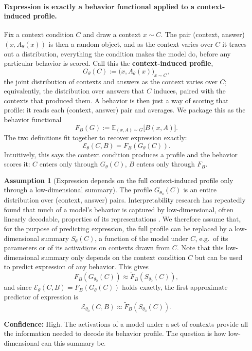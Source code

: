 \documentclass[11pt]{article}
\theoremstyle{definition}
\theoremstyle{definition}
\theoremstyle{assumptionstyle}
\newtheorem{assumption}{Assumption}[section]
\newcommand{\E}{\mathbb{E}}            %
\newcommand{\Expr}{\mathcal{E}}        %
\begin{document}
\paragraph{Expression is exactly a behavior functional applied to a context-induced profile.}
Fix a context condition \(C\) and draw a context \(x\sim C\). The pair
(context, answer) \((x,A_\theta(x))\) is then a random object, and
as the context varies over \(C\) it traces out a distribution, everything the
condition makes the model do, before any particular behavior is scored. Call this the
\textbf{context-induced profile},
\[
G_\theta(C)
:=
\big(x,A_\theta(x)\big)_{x\sim C},
\]
the joint distribution of contexts and answers as the context varies over \(C\);
equivalently, the distribution over answers that \(C\) induces, paired with the
contexts that produced them. A behavior is
then just a way of scoring that profile: it reads each (context, answer) pair and
averages. We package this as the behavior functional
\[
F_B(G)
:=
\E_{(x,A)\sim G}
\big[
B(x,A)
\big].
\]
The two definitions fit together to recover expression exactly:
\[
\Expr_\theta(C,B)
=
F_B(G_\theta(C)).
\]
Intuitively, this says the context condition produces a profile and the behavior
scores it: \(C\) enters only through \(G_\theta(C)\), \(B\) enters only through
\(F_B\).
\begin{assumption}[Expression depends on the full context-induced profile only through a low-dimensional summary]
\label{a:profile-summary}
The profile \(G_{\theta_0}(C)\) is an entire distribution over (context, answer)
pairs. Interpretability research has repeatedly found that much of a model's
behavior is captured by low-dimensional, often linearly decodable, properties of
its representations \cite{park2023,gurnee2023,belrose2023,zou2023}. We therefore
assume that, for the purpose of predicting expression, the full profile can be
replaced by a low-dimensional summary \(S_\theta(C)\), a function of the model
under \(C\), e.g.\ of its parameters or of its activations on contexts drawn
from \(C\). Note that this low-dimensional summary only depends on the context condition $C$ but can be used to predict expression of any behavior.
This gives
\[
F_B(G_{\theta_0}(C))
\approx
\widetilde F_B(S_{\theta_0}(C)),
\]
and since \(\Expr_\theta(C,B)=F_B(G_\theta(C))\) holds exactly, the first
approximate predictor of expression is
\[
\Expr_{\theta_0}(C,B)
\approx
\widetilde F_B(S_{\theta_0}(C)).
\]
\end{assumption}

\textbf{Confidence:} High. The activations of a model under a set of contexts provide all the information needed to decode its behavior profile. The question is how low-dimensional can this summary be.
\end{document}
